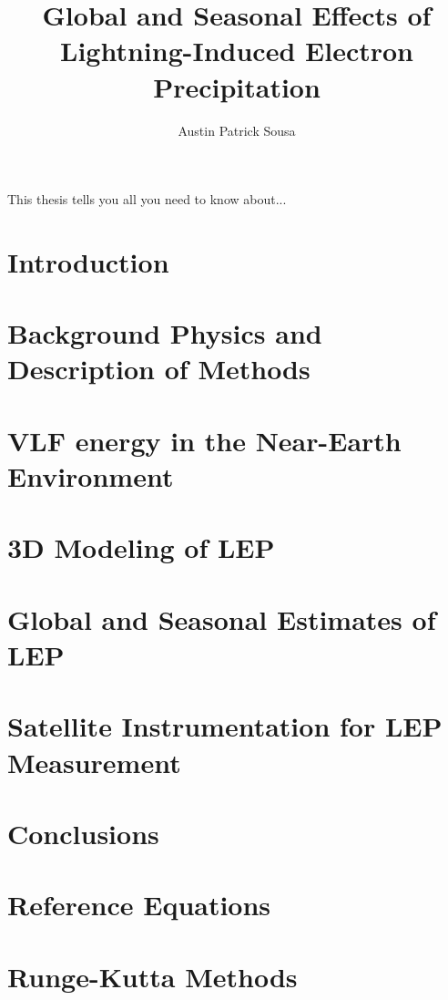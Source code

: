 \documentclass[12pt]{report}
\begin{document}
    \title{Global and Seasonal Effects of\\
            Lightning-Induced Electron Precipitation}
    \author{Austin Patrick Sousa}
    \beforepreface
        This thesis tells you all you need to know about...
        
    \afterpreface
 
    \chapter{Introduction}
    	

    \chapter[Physics and Methods]{Background Physics and Description of Methods}
    	



    \chapter{VLF energy in the Near-Earth Environment}
    	

    \chapter{3D Modeling of LEP}
  	

    \chapter{Global and Seasonal Estimates of LEP}
    	

    \chapter{Satellite Instrumentation for LEP Measurement}
    	

    \chapter{Conclusions}
    	

   \appendix
   \chapter{Reference Equations}
    
    
    \chapter{Runge-Kutta Methods}
    

    
    
\end{document}
